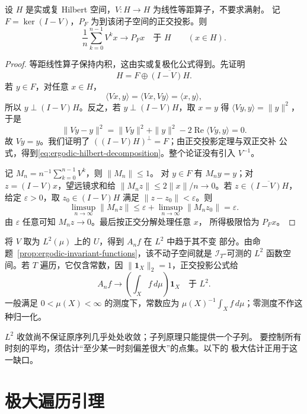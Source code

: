 \begin{theorem}
\label{thm:von-neumann-mean-ergodic}
设 $H$ 是实或复 Hilbert 空间，$V:H\to H$ 为线性等距算子，不要求满射。
记 $F=\ker(I-V)$，$P_F$ 为到该闭子空间的正交投影。则
\[
 \frac1n\sum_{k=0}^{n-1}V^kx\longrightarrow P_Fx
 \quad\text{于 }H\qquad(x\in H).
\]
\end{theorem}
\begin{proof}
等距线性算子保持内积，这由实或复极化公式得到。先证明
\begin{equation}\label{eq:ergodic-hilbert-decomposition}
 H=F\oplus\overline{(I-V)H}.
\end{equation}
若 $y\in F$，对任意 $x\in H$，
\[
 \langle Vx,y\rangle=\langle Vx,Vy\rangle=\langle x,y\rangle,
\]
所以 $y\perp(I-V)H$。反之，若 $y\perp(I-V)H$，取 $x=y$ 得
$\langle Vy,y\rangle=\|y\|^2$，于是
\[
 \|Vy-y\|^2
 =\|Vy\|^2+\|y\|^2-2\operatorname{Re}\langle Vy,y\rangle=0.
\]
故 $Vy=y$。我们证明了 $((I-V)H)^\perp=F$；由正交投影定理与双正交补
公式，得到\eqref{eq:ergodic-hilbert-decomposition}。整个论证没有引入
$V^{-1}$。

记 $M_n=n^{-1}\sum_{k=0}^{n-1}V^k$，则 $\|M_n\|\le1$。
对 $y\in F$ 有 $M_ny=y$；对 $z=(I-V)x$，望远镜求和给
$\|M_nz\|\le2\|x\|/n\to0$。若
$z\in\overline{(I-V)H}$，给定 $\varepsilon>0$，取
$z_0\in(I-V)H$ 满足 $\|z-z_0\|<\varepsilon$。则
\[
 \limsup_{n\to\infty}\|M_nz\|
 \le\varepsilon+\limsup_{n\to\infty}\|M_nz_0\|=\varepsilon.
\]
由 $\varepsilon$ 任意可知 $M_nz\to0$。最后按正交分解处理任意 $x$，
所得极限恰为 $P_Fx$。
\end{proof}

将 $V$ 取为 $L^2(\mu)$ 上的 $U$，得到 $A_nf$ 在 $L^2$ 中趋于其不变
部分。由命题~\ref{prop:ergodic-invariant-functions}，该不动子空间就是
$\mathcal I_T$-可测的 $L^2$ 函数空间。若 $T$ 遍历，它仅含常数，因
$\|\mathbf1_X\|_2=1$，正交投影公式给
\begin{equation}\label{eq:ergodic-ltwo-space-average}
 A_nf\longrightarrow\left(\int_Xf\,d\mu\right)\mathbf1_X
 \quad\text{于 }L^2.
\end{equation}
一般满足 $0<\mu(X)<\infty$ 的测度下，常数应为
$\mu(X)^{-1}\int_Xf\,d\mu$；零测度不作这种归一化。

$L^2$ 收敛尚不保证原序列几乎处处收敛；子列原理只能提供一个子列。
要控制所有时刻的平均，须估计“至少某一时刻偏差很大”的点集。以下的
极大估计正用于这一缺口。

\section{极大遍历引理}
\label{sec:maximal-ergodic-lemma}

